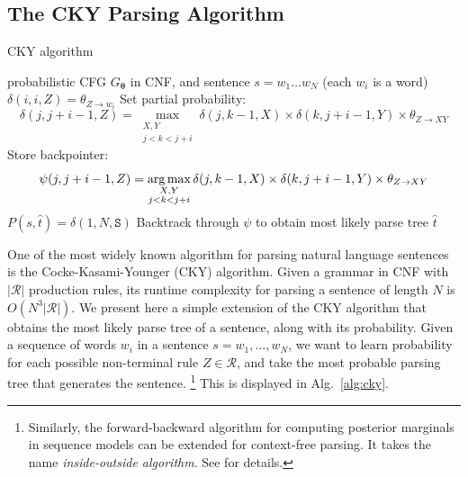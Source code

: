 \subsection{The CKY Parsing Algorithm}

\begin{algorithm}[h!]
   \caption{CKY algorithm \label{alg:cky}}
\begin{algorithmic}[1]
    probabilistic CFG ${G}_{\boldsymbol{\theta}}$ in CNF, and sentence $s=w_1\ldots w_N$ (each $w_i$ is a word)
	\STATE   
   \STATE {}
	\STATE
   \STATE {}
	\STATE $\delta(i,i,Z) = \theta_{Z \rightarrow w_i}$
	\ENDFOR
	\ENDFOR
	\STATE
	\STATE {}
	\STATE Set partial probability: 
	$$\delta(j,j+i-1,Z) = \max_{\substack{X,Y\\j<k<j+i}}  \delta(j,k-1,X) \times \delta(k,j+i-1,Y) \times \theta_{Z \rightarrow X Y}$$
	\STATE Store backpointer: 
	$$\psi(j,j+i-1,Z) = \operatorname*{arg\,max}_{\substack{X,Y\\j<k<j+i}}  \delta(j,k-1,X) \times \delta(k,j+i-1,Y) \times \theta_{Z \rightarrow X Y}$$
	\ENDFOR
	\ENDFOR
	\ENDFOR
	\STATE
	\STATE {}
	\STATE $P(s,{\hat t}) = \delta(1,N,\texttt{S})$
	\STATE Backtrack through $\psi$ to obtain most likely parse tree ${\hat t}$
\end{algorithmic}
\end{algorithm}


One of the most widely known algorithm for parsing natural language sentences is the 
Cocke-Kasami-Younger (CKY) algorithm. 
Given a grammar in CNF with $|\mathcal{R}|$ production rules, its runtime complexity for parsing a sentence of length $N$ 
is $O(N^3 |\mathcal{R}| )$. 
We present here a simple extension of the CKY algorithm 
that obtains the most likely parse tree of a sentence, along with its probability.%
Given a sequence of words $w_i$ in a sentence $s=w_1,\dots,w_N$, we want to learn probability for each possible non-terminal rule $Z\in \mathcal{R}$, and take the most probable parsing tree that generates the sentence.  
\footnote{Similarly, the forward-backward algorithm for computing posterior marginals in sequence models can be extended for 
context-free parsing. It takes the name \emph{inside-outside algorithm}. See \citet{Manning1999} for details.} %
This is displayed in Alg.~\ref{alg:cky}. 

